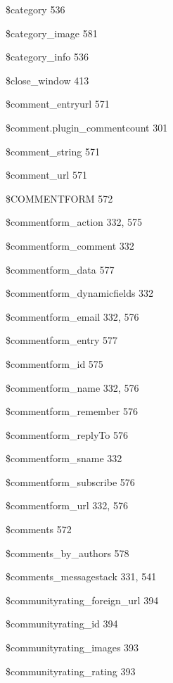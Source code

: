 \documentclass{book}
\renewcommand\subitem{\par}
\begin{document}
\begin{multicols}{2}
\begin{osp-index}
    \subitem \$category\hspace{1mm} 536
    \subitem \$category\_image\hspace{1mm} 581
    \subitem \$category\_info\hspace{1mm} 536
    \subitem \$close\_window\hspace{1mm} 413
    \subitem \$comment\_entryurl\hspace{1mm} 571
    \subitem \$comment.plugin\_commentcount\hspace{1mm} 301
    \subitem \$comment\_string\hspace{1mm} 571
    \subitem \$comment\_url\hspace{1mm} 571
    \subitem \$COMMENTFORM\hspace{1mm} 572
    \subitem \$commentform\_action\hspace{1mm} 332, 575
    \subitem \$commentform\_comment\hspace{1mm} 332
    \subitem \$commentform\_data\hspace{1mm} 577
    \subitem \$commentform\_dynamicfields\hspace{1mm} 332
    \subitem \$commentform\_email\hspace{1mm} 332, 576
    \subitem \$commentform\_entry\hspace{1mm} 577
    \subitem \$commentform\_id\hspace{1mm} 575
    \subitem \$commentform\_name\hspace{1mm} 332, 576
    \subitem \$commentform\_remember\hspace{1mm} 576
    \subitem \$commentform\_replyTo\hspace{1mm} 576
    \subitem \$commentform\_sname\hspace{1mm} 332
    \subitem \$commentform\_subscribe\hspace{1mm} 576
    \subitem \$commentform\_url\hspace{1mm} 332, 576
    \subitem \$comments\hspace{1mm} 572
    \subitem \$comments\_by\_authors\hspace{1mm} 578
    \subitem \$comments\_messagestack\hspace{1mm} 331, 541
    \subitem \$communityrating\_foreign\_url\hspace{1mm} 394
    \subitem \$communityrating\_id\hspace{1mm} 394
    \subitem \$communityrating\_images\hspace{1mm} 393
    \subitem \$communityrating\_rating\hspace{1mm} 393

\end{osp-index}
\end{multicols}
\end{document}
